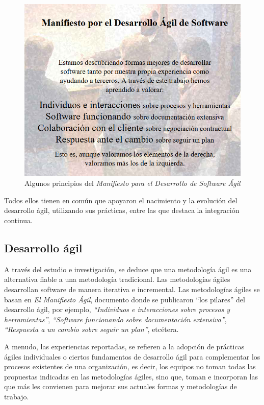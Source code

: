\begin{figure}[!h]
\centering
   \includegraphics[width=12cm]{Manifiesto_Agil.PNG}
\caption{Algunos principios del \textit{Manifiesto para el Desarrollo de Software Ágil} \cite{TheAgileManifesto}}
\end{figure}

Todos ellos tienen en común que apoyaron el nacimiento y la evolución del desarrollo ágil, utilizando sus prácticas, entre las que destaca la integración continua.


\subsection{Desarrollo ágil}

A través del estudio e investigación, se deduce que una metodología ágil es una alternativa fiable a una metodología tradicional. Las metodologías ágiles desarrollan software de manera iterativa e incremental. Las metodologías ágiles se basan en \textit{El Manifiesto Ágil}\cite{TheAgileManifesto}, documento donde se publicaron ``los pilares'' del desarrollo ágil, por ejemplo, \textit{``Individuos e interacciones sobre procesos y herramientas''}, \textit{``Software funcionando sobre documentación extensiva''}, \textit{``Respuesta a un cambio sobre seguir un plan''}, etcétera.

A menudo, las experiencias reportadas, se refieren a la adopción de prácticas ágiles individuales o ciertos fundamentos de desarrollo ágil para complementar los procesos existentes de una organización, es decir, los equipos no toman todas las propuestas indicadas en las metodologías ágiles, sino que, toman e incorporan las que más les convienen para mejorar sus actuales formas y metodologías de trabajo.

